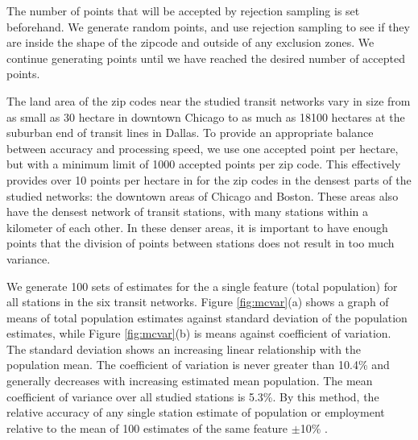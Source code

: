 \documentclass[11pt]{report}
\begin{document}
The number of points that will be accepted by rejection sampling is set beforehand. We generate random points, and use rejection sampling to see if they are inside the shape of the zipcode and outside of any exclusion zones. We continue generating points until we have reached the desired number of accepted points.

The land area of the zip codes near the studied transit networks vary in size from as small as 30 hectare in downtown Chicago to as much as 18100 hectares at the suburban end of transit lines in Dallas. To provide an appropriate balance between accuracy and processing speed, we use one accepted point per hectare, but with a minimum limit of 1000 accepted points per zip code. This effectively provides over 10 points per hectare in for the zip codes in the densest parts of the studied networks: the downtown areas of Chicago and Boston. These areas also have the densest network of transit stations, with many stations within a kilometer of each other. In these denser areas, it is important to have enough points that the division of points between stations does not result in too much variance. 

We generate 100 sets of estimates for the a single feature (total population) for all stations in the six transit networks. Figure \ref{fig:mcvar}(a) shows a graph of means of total population estimates against standard deviation of the population estimates, while Figure \ref{fig:mcvar}(b) is means against coefficient of variation. The standard deviation shows an increasing linear relationship with the population mean. The coefficient of variation is never greater than 10.4\% and generally decreases with increasing estimated mean population. The mean coefficient of variance over all studied stations is 5.3\%. By this method, the relative accuracy of any single station estimate of population or employment relative to the mean of 100 estimates of the same feature $\pm$10\% .
\end{document}
